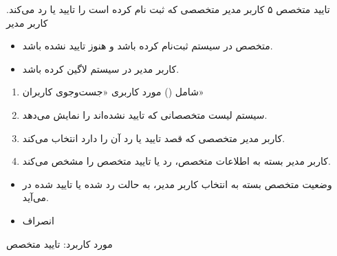 {
\usecase
{تایید متخصص}
{۵}
{کاربر مدیر متخصصی که ثبت نام کرده است را تایید یا رد می‌کند.}
{کاربر مدیر}
{}
{
	\begin{itemize}
	\item 
متخصص در سیستم ثبت‌نام کرده باشد و هنوز تایید نشده باشد.
	
	\item
کاربر مدیر در سیستم لاگین کرده باشد.
\end{itemize}
}
{
\begin{enumerate}
	\item 
	شامل () مورد کاربری «جست‌وجوی کاربران»
	\item
	سیستم لیست متخصصانی که تایید نشده‌اند را نمایش می‌دهد.
	
	\item 
کاربر مدیر متخصصی که قصد تایید یا رد آن را دارد انتخاب می‌کند.
	
	\item 
کاربر مدیر بسته به اطلاعات متخصص، رد یا تایید متخصص را مشخص می‌کند.
\end{enumerate}
}
{\begin{itemize}
	\item
	وضعیت متخصص بسته به انتخاب کاربر مدیر، به حالت رد شده یا تایید شده در می‌آید.
\end{itemize}}
{
\begin{itemize}
	\item
	 انصراف
\end{itemize}
}
{مورد کاربرد: تایید متخصص}




}

